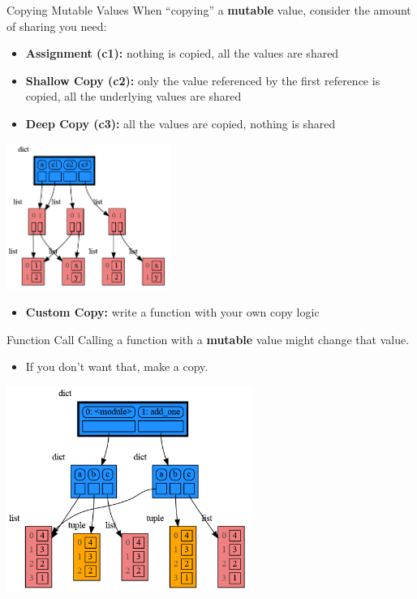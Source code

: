 \documentclass[10pt]{beamer}
\begin{document}
\begin{frame}{Copying Mutable Values}
  When ``copying'' a \textbf{mutable} value, consider the amount of sharing you need:
    \begin{itemize}
        \item \textbf{Assignment (c1):} nothing is copied, all the values are shared
        \item \textbf{Shallow Copy (c2):} only the value referenced by the first reference is copied, all the underlying values are shared
        \item \textbf{Deep Copy (c3):} all the values are copied, nothing is shared
    \end{itemize}

    \begin{center}\includegraphics[width=0.4\textwidth]{figures/copy.png}\end{center}

    \begin{itemize}
        \item \textbf{Custom Copy:} write a function with your own copy logic
    \end{itemize}
\end{frame}

\begin{frame}{Function Call}
  Calling a function with a \textbf{mutable} value might change that value.
  \begin{itemize}
  \item If you don't want that, make a copy.
  \end{itemize}
  \begin{center}\includegraphics[width=0.6\textwidth]{figures/function_call.png}\end{center}

\end{frame}
\end{document}

